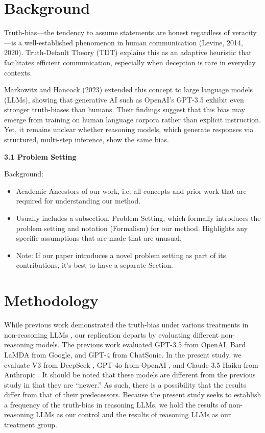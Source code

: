 \documentclass{article}
\begin{document}
\section{Background}

Truth-bias—the tendency to assume statements are honest regardless of veracity—is a well-established phenomenon in human communication (Levine, 2014, 2020). Truth-Default Theory (TDT) explains this as an adaptive heuristic that facilitates efficient communication, especially when deception is rare in everyday contexts. 

Markowitz and Hancock (2023) extended this concept to large language models (LLMs), showing that generative AI such as OpenAI’s GPT-3.5 exhibit even stronger truth-biases than humans. Their findings suggest that this bias may emerge from training on human language corpora rather than explicit instruction. Yet, it remains unclear whether reasoning models, which generate responses via structured, multi-step inference, show the same bias.

\textbf{3.1 Problem Setting}

Background:
\begin{itemize}
    \item Academic Ancestors of our work, i.e. all concepts and prior work that are required for understanding our method. 
    \item Usually includes a subsection, Problem Setting, which formally introduces the problem setting and notation (Formalism) for our method. Highlights any specific assumptions that are made that are unusual. 
    \item Note: If our paper introduces a novel problem setting as part of its contributions, it’s best to have a separate Section.
\end{itemize}


\section{Methodology}

While previous work demonstrated the truth-bias under various treatments in non-reasoning LLMs \citep{markowitz_generative_2024}, our replication departs by evaluating different non-reasoning models. The previous work evaluated GPT-3.5 from OpenAI, Bard LaMDA from Google, and GPT-4 from ChatSonic. In the present study, we evaluate V3 from DeepSeek \citep{deepseekai2025deepseekv3technicalreport}, GPT-4o from OpenAI \citep{openai2024gpt4ocard}, and Claude 3.5 Haiku from Anthropic \citep{anthropic_claude_2024}. It should be noted that these models are different from the previous study in that they are ``newer.'' As such, there is a possibility that the results differ from that of their predecessors. Because the present study seeks to establish a frequency of the truth-bias in reasoning LLMs, we hold the results of non-reasoning LLMs as our control and the results of reasoning LLMs as our treatment group.
\end{document}
